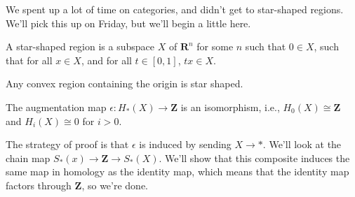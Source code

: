 We spent up a lot of time on categories, and didn't get to star-shaped regions. We'll pick this up on Friday, but we'll begin a little here.
\begin{definition}
A star-shaped region is a subspace $X$ of $\mathbf{R}^n$ for some $n$ such that $0\in X$, such that for all $x\in X$, and for all $t\in[0,1]$, $tx\in X$. 
\end{definition}
\begin{example}
Any convex region containing the origin is star shaped.
\end{example}
\begin{theorem}
The augmentation map $\epsilon: H_\ast(X)\to \mathbf{Z}$ is an isomorphism, i.e., $ H_0(X)\cong\mathbf{Z}$ and $ H_i(X)\cong 0$ for $i>0$.
\end{theorem}
The strategy of proof is that $\epsilon$ is induced by sending $X\to \ast$. We'll look at the chain map $S_\ast(x)\to\mathbf{Z}\to S_\ast(X)$. We'll show that this composite induces the same map in homology as the identity map, which means that the identity map factors through $\mathbf{Z}$, so we're done.


